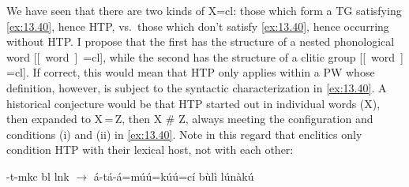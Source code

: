 \documentclass[output=paper]{langsci/langscibook}
\begin{document}
\ea\label{ex:13.40}
\z
We have seen that there are two kinds of X=cl: those which form a
\gls{TG} satisfying \eqref{ex:13.40}, hence \gls{HTP}, vs.\ those
which don’t satisfy \eqref{ex:13.40}, hence occurring without \gls{HTP}. I
propose that the first has the structure of a nested phonological word
[[~word~]~=cl], while the second has the structure of a
clitic group [[~word~] =cl]. If correct, this would mean that
\gls{HTP} only applies within a \gls{PW} whose definition, however, is subject
to the syntactic characterization in \eqref{ex:13.40}. A historical
conjecture would be that \gls{HTP} started out in individual words (X), then
expanded to X\,=\,Z, then X \# Z, always meeting the configuration and conditions
(i) and (ii) in \eqref{ex:13.40}. Note in this regard that enclitics only
condition \gls{HTP} with their lexical host, not with each other:

\ea\label{ex:13.41}
    -t-mkc
         bl lnk ${\rightarrow}$
        á-tá-á=\ds{}múú=\ds{}kúú=\ds{}cí
        bùlì lúnàkú\\\vspace{2.75\baselineskip}
\end{document}
